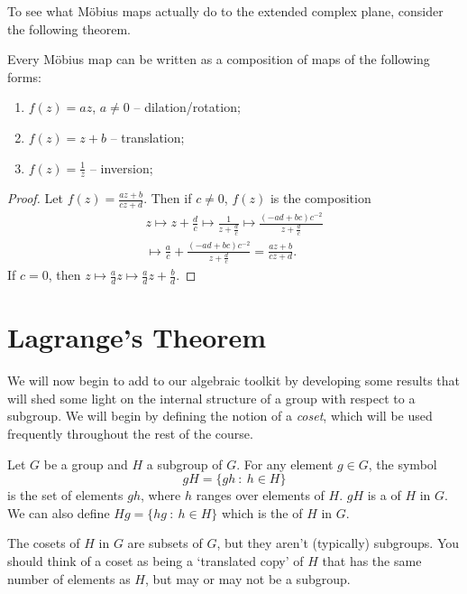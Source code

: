 \documentclass[a4]{scrreprt}
\begin{document}
To see what Möbius maps actually do to the extended complex plane, consider the following theorem.

\begin{theorem}
	Every Möbius map can be written as a composition of maps of the following forms:
	\begin{enumerate}
		\item $f(z) = az$, $a \neq 0$ -- dilation/rotation;
		\item $f(z) = z + b$ -- translation;
		\item $f(z) = \frac{1}{z}$ -- inversion;
	\end{enumerate}
\end{theorem}
\begin{proof}
	Let $f(z) = \frac{az + b}{cz + d}$. Then if $c \neq 0$, $f(z)$ is the composition
	\begin{align*}
		z \longmapsto z + \frac{d}{c} \longmapsto \frac{1}{z + \frac{d}{c}} \longmapsto \frac{(-ad + bc)c^{-2}}{z + \frac{d}{c}} \\
		\longmapsto \frac{a}{c} + \frac{(-ad + bc)c^{-2}}{z + \frac{d}{c}} = \frac{az + b}{cz + d}.
	\end{align*}
	If $c = 0$, then $z \mapsto \frac{a}{d}z \mapsto \frac{a}{d}z + \frac{b}{d}$. 
\end{proof}

\chapter{Lagrange's Theorem}

We will now begin to add to our algebraic toolkit by developing some results that will shed some light on the internal structure of a group with respect to a subgroup. We will begin by defining the notion of a \emph{coset}, which will be used frequently throughout the rest of the course.

\begin{definition}[Coset]
	Let $G$ be a group and $H$ a subgroup of $G$. For any element $g \in G$, the symbol
	$$
	gH = \{gh \ : \ h \in H\}
	$$
	is the set of elements $gh$, where $h$ ranges over elements of $H$. $gH$ is a  of $H$ in $G$. We can also define $Hg = \{hg \ :\ h \in H\}$ which is the  of $H$ in $G$.
\end{definition}

The cosets of $H$ in $G$ are subsets of $G$, but they aren't (typically) subgroups. You should think of a coset as being a `translated copy' of $H$ that has the same number of elements as $H$, but may or may not be a subgroup.
\end{document}
